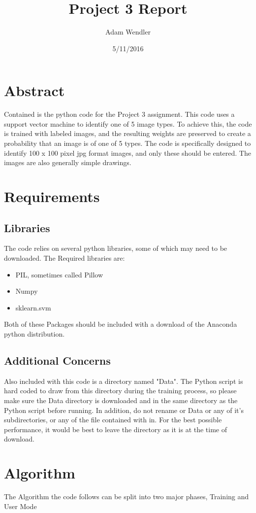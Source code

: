 \documentclass[11pt, oneside]{article}   	%
\title{Project 3 Report}
\author{Adam Wendler}
\date{5/11/2016}							%
\begin{document}
\maketitle
\section{Abstract}
	Contained is the python code for the Project 3 assignment.  This code uses a support vector machine to identify one of 5 image types.  To achieve this, the code is trained with labeled images, and the resulting  weights are preserved to create a probability that an image is of one of 5 types.  The code is specifically designed to identify 100 x 100 pixel jpg format images, and only these should be entered.  The images are also generally simple drawings.

\section{Requirements}
\subsection{Libraries}
	The code relies on several python libraries, some of which may need to be downloaded.  The Required libraries are:
\begin{itemize}
\item	PIL, sometimes called Pillow
\item Numpy
\item	sklearn.svm
\end{itemize}
Both of these Packages should be included with a download of the Anaconda python distribution.

\subsection{Additional Concerns}
	Also included with this code is a directory named "Data".  The Python script is hard coded to draw from this directory during the training process, so please make sure the Data directory is downloaded and in the same directory as the Python script before running.  In addition, do not rename or Data or any of it's subdirectories, or any of the file contained with in.  For the best possible performance, it would be best to leave the directory as it is at the time of download.
	
\section{Algorithm}
	The Algorithm the code follows can be split into two major phases, Training and User Mode
	
\end{document}
